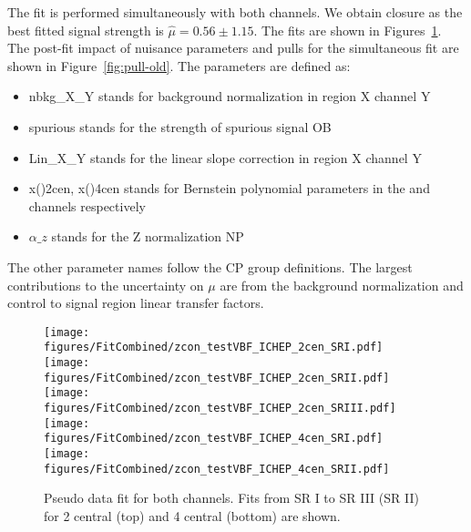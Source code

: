 The fit is performed simultaneously with both channels. We obtain closure as the best fitted signal strength is $\hat \mu = 0.56 \pm 1.15$. The fits are shown in Figures~\ref{fig:Fit_combined-old}. The post-fit impact of nuisance parameters and pulls for the simultaneous fit are shown in Figure~\ref{fig:pull-old}.  
The parameters are defined as:
\begin{itemize}
\item nbkg\_X\_Y stands for background normalization in region X channel Y
\item spurious stands for the strength of spurious signal
OB\item  Lin\_X\_Y stands for the linear slope correction in region X channel Y
\item x()2cen, x()4cen stands for Bernstein polynomial parameters in the \twocentral and \fourcentral channels respectively
\item $\alpha\_z$ stands for the Z normalization NP
\end{itemize} 
The other parameter names follow the CP group definitions.  
The largest contributions to the uncertainty on $\mu$ are from the background normalization and 
control to signal region linear transfer factors. 

\begin{figure}[htbp]
  \centering
 \texttt{[image: figures/FitCombined/zcon\_testVBF\_ICHEP\_2cen\_SRI.pdf]}
 \texttt{[image: figures/FitCombined/zcon\_testVBF\_ICHEP\_2cen\_SRII.pdf]}
 \texttt{[image: figures/FitCombined/zcon\_testVBF\_ICHEP\_2cen\_SRIII.pdf]}\\
 \texttt{[image: figures/FitCombined/zcon\_testVBF\_ICHEP\_4cen\_SRI.pdf]}
 \texttt{[image: figures/FitCombined/zcon\_testVBF\_ICHEP\_4cen\_SRII.pdf]}\\

\caption{Pseudo data fit for both channels. Fits from SR I to SR III (SR II) for 2 central (top) and 4 central (bottom) are shown.}
  \label{fig:Fit_combined-old}
\end{figure}




